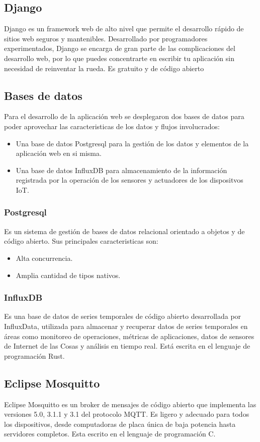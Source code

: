 \subsection{Django}
Django es un framework web de alto nivel que permite el desarrollo rápido de sitios web seguros y mantenibles. Desarrollado por programadores experimentados, Django se encarga de gran parte de las complicaciones del desarrollo web, por lo que puedes concentrarte en escribir tu aplicación sin necesidad de reinventar la rueda. Es gratuito y de código abierto

\subsection{Bases de datos}
Para el desarrollo de la aplicación web se desplegaron dos bases de datos para poder aprovechar las caracteristicas de los datos y flujos involucrados:
\begin{itemize}
\item Una base de datos Postgresql para la gestión de los datos y elementos de la aplicación web en si misma.
\item Una base de datos InfluxDB para almacenamiento de la información registrada por la operación de los sensores y actuadores de los dispositvos IoT.
\end{itemize}

\subsubsection{Postgresql}
Es un sistema de gestión de bases de datos relacional orientado a objetos y de código abierto. Sus principales caracteristicas son:
\begin{itemize}
\item Alta concurrencia.
\item Amplia cantidad de tipos nativos.
\end{itemize}

\subsubsection{InfluxDB}
Es una base de datos de series temporales de código abierto desarrollada por InfluxData, utilizada para almacenar y recuperar datos de series temporales en áreas como monitoreo de operaciones, métricas de aplicaciones, datos de sensores de Internet de las Cosas y análisis en tiempo real. Está escrita en el lenguaje de programación Rust.

\subsection{Eclipse Mosquitto}
Eclipse Mosquitto es un broker de mensajes de código abierto que implementa las versiones 5.0, 3.1.1 y 3.1 del protocolo MQTT. Es ligero y adecuado para todos los dispositivos, desde computadoras de placa única de baja potencia hasta servidores completos. Esta escrito en el lenguaje de programación C.

